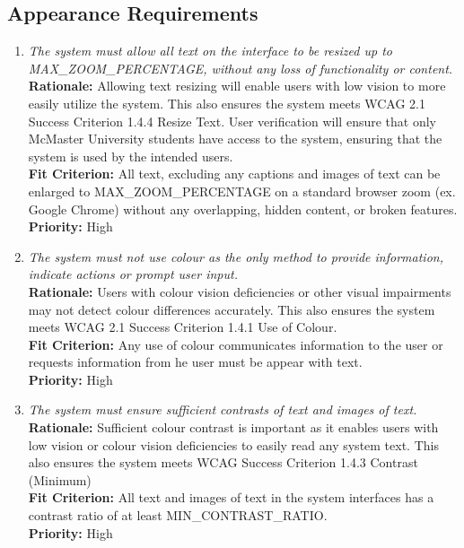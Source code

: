 \documentclass[12pt]{article}
\begin{document}
\subsection{Appearance Requirements}
\begin{enumerate}[label=LFR-AR \arabic*., wide=0pt, leftmargin=*]
  \item \emph{The system must allow all text on the interface to be resized up to MAX\_ZOOM\_PERCENTAGE, without any loss of functionality or content. }\\[2mm] 
    {\bf Rationale:} Allowing text resizing will enable users with low vision to more easily utilize the system. This also ensures the system meets WCAG 2.1 Success Criterion 1.4.4 Resize Text.
    User verification will ensure that only McMaster University students have access to the system, ensuring that the system is used by the intended users.  \\
    {\bf Fit Criterion:} All text, excluding any captions and images of text can be enlarged to MAX\_ZOOM\_PERCENTAGE on a standard browser zoom (ex. Google Chrome) without any overlapping, hidden content, or broken features.  \\
    {\bf Priority:} High
  \item \emph{The system must not use colour as the only method to
    provide information, indicate actions or prompt user input.}\\[2mm]
    {\bf Rationale:} Users with colour vision deficiencies or other
    visual impairments may not detect colour differences accurately.
    This also ensures the system meets WCAG 2.1 Success Criterion
    1.4.1 Use of Colour.\\
    {\bf Fit Criterion:} Any use of colour communicates information to
    the user or requests information from he user must be appear with text.  \\
    {\bf Priority:} High
  \item \emph{The system must ensure sufficient contrasts of text and images of text.}\\[2mm] 
    {\bf Rationale:} Sufficient colour contrast is important as it enables users with low vision or colour vision deficiencies to easily read any system text. This also ensures the system meets WCAG Success Criterion 1.4.3 Contrast (Minimum)\\
    {\bf Fit Criterion:}  All text and images of text in the system interfaces has a contrast ratio of at least MIN\_CONTRAST\_RATIO.  \\
    {\bf Priority:} High

\end{enumerate}
\end{document}
